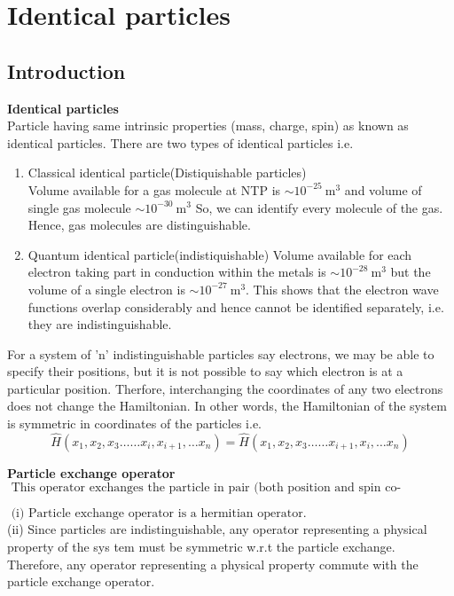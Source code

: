 \chapter{Identical particles}
\section{Introduction}
\textbf{Identical particles}\\
Particle having same intrinsic properties (mass, charge, spin) as known as identical particles. There are two types of identical particles i.e.
\begin{enumerate}
	\item Classical identical particle(Distiquishable particles)\\
	Volume available for a gas molecule at NTP is $\sim 10^{-25} \mathrm{~m}^{3}$ and volume of single gas molecule $\sim 10^{-30} \mathrm{~m}^{3}$ So, we can identify every molecule of the gas. Hence, gas molecules are distinguishable.
	\item Quantum identical particle(indistiquishable)
	Volume available for each electron taking part in conduction within the metals is $\sim 10^{-28} \mathrm{~m}^{3}$ but the volume of a single electron is $\sim 10^{-27} \mathrm{~m}^{3}$. This shows that the electron wave functions overlap considerably and hence cannot be identified separately, i.e. they are indistinguishable.
\end{enumerate}
\begin{note}
	For a system of 'n' indistinguishable particles say electrons, we may be able to specify their positions, but it is not possible to say which electron is at a particular position. Therfore, interchanging the coordinates of any two electrons does not change the Hamiltonian. In other words, the Hamiltonian of the system is symmetric in coordinates of the particles i.e.
	$$
	\hat{H}\left(x_{1}, x_{2}, x_{3} \ldots \ldots x_{i}, x_{i+1}, \ldots x_{n}\right)=\hat{H}\left(x_{1}, x_{2}, x_{3} \ldots \ldots x_{i+1}, x_{i}, \ldots x_{n}\right)
	$$
	\end{note}
\textbf{Particle exchange operator}\\
$\text { This operator exchanges the particle in pair (both position and spin co-ordinates). }$
\begin{note}
	$\text { (i) Particle exchange operator is a hermitian operator. }$\\
	(ii) Since particles are indistinguishable, any operator representing a physical property of the sys tem must be symmetric w.r.t the particle exchange. Therefore, any operator representing a physical property commute with the particle exchange operator.
\end{note}

